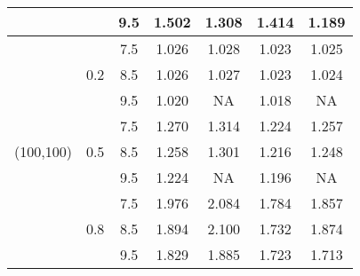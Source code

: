 \documentclass[a4,11pt,epsf, amssymb]{article}
\begin{document}
\begin{table}[htbp]
\begin{tabular}{c|cccccc}
          &       & 9.5   & 1.502  & 1.308  & 1.414  & 1.189  \\
    \hline
    \multirow{9}[6]{*}{(100,100)} & \multirow{3}[2]{*}{0.2} & 7.5   & 1.026  & 1.028  & 1.023  & 1.025  \\
          &       & 8.5   & 1.026  & 1.027  & 1.023  & 1.024  \\
          &       & 9.5   & 1.020  & NA    & 1.018  & NA \\
\cline{2-7}          & \multirow{3}[2]{*}{0.5} & 7.5   & 1.270  & 1.314  & 1.224  & 1.257  \\
          &       & 8.5   & 1.258  & 1.301  & 1.216  & 1.248  \\
          &       & 9.5   & 1.224  & NA    & 1.196  & NA \\
\cline{2-7}          & \multirow{3}[2]{*}{0.8} & 7.5   & 1.976  & 2.084  & 1.784  & 1.857 \\
          &       & 8.5   & 1.894  & 2.100  & 1.732  & 1.874  \\
          &       & 9.5   & 1.829  & 1.885  & 1.723  & 1.713  \\
    \hline
    \end{tabular}%
  \label{tab:addlabel}%
\end{table}%
\end{document}
